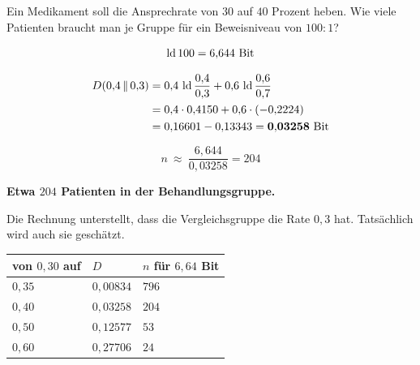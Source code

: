 \begin{aufgabe}
Ein Medikament soll die Ansprechrate von $30$ auf $40$ Prozent heben. Wie viele Patienten braucht man je Gruppe für ein Beweisniveau von $100{:}1$?

\loesung
{}
\[ \lb 100 = 6{,}644 \ \text{Bit} \]

\begin{align*}
D(0{,}4\,\|\,0{,}3) &= 0{,}4\,\operatorname{ld}\frac{0{,}4}{0{,}3} + 0{,}6\,\operatorname{ld}\frac{0{,}6}{0{,}7}\\
&= 0{,}4\cdot0{,}4150 + 0{,}6\cdot(-0{,}2224)\\
&= 0{,}16601 - 0{,}13343 = \mathbf{0{,}03258} \ \text{Bit}
\end{align*}

\[ n \ \approx\ \frac{6{,}644}{0{,}03258} = 204 \]

\begin{center}
\begin{minipage}{0.9\textwidth}
\textbf{Etwa $204$ Patienten in der Behandlungsgruppe.}
\end{minipage}
\end{center}

Die Rechnung unterstellt, dass die Vergleichsgruppe die Rate $0{,}3$  hat. Tatsächlich wird auch sie geschätzt.

\begin{center}
\begin{minipage}{0.88\textwidth}
\end{minipage}
\end{center}

\begin{center}
{\small
\renewcommand{\arraystretch}{1.48}
\begin{tabular}{@{}P{2.4cm}P{2.2cm}P{2.4cm}@{}}
\toprule
\textbf{von $0{,}30$ auf} & $D$ & $n$ für $6{,}64$ Bit\\
\midrule
$0{,}35$ & $0{,}00834$ & $796$\\
$0{,}40$ & $0{,}03258$ & $204$\\
$0{,}50$ & $0{,}12577$ & $53$\\
$0{,}60$ & $0{,}27706$ & $24$\\
\bottomrule
\end{tabular}}
\end{center}


\end{aufgabe}
